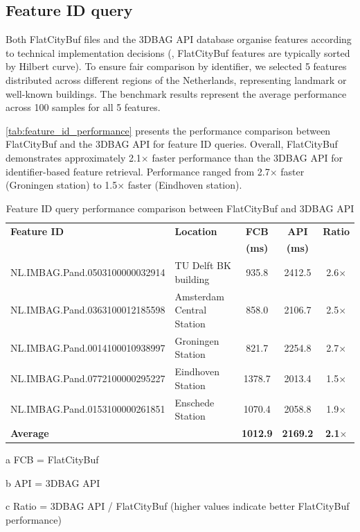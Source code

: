 \subsection{Feature ID query}
\label{result:benchmark_over_the_web:feature_id_query}

Both FlatCityBuf files and the 3DBAG API database organise features according to technical implementation decisions (\eg, FlatCityBuf features are typically sorted by Hilbert curve). To ensure fair comparison by identifier, we selected 5 features distributed across different regions of the Netherlands, representing landmark or well-known buildings. The benchmark results represent the average performance across 100 samples for all 5 features.

\autoref{tab:feature_id_performance} presents the performance comparison between FlatCityBuf and the 3DBAG API for feature ID queries. Overall, FlatCityBuf demonstrates approximately 2.1$\times$ faster performance than the 3DBAG API for identifier-based feature retrieval. Performance ranged from 2.7$\times$ faster (Groningen station) to 1.5$\times$ faster (Eindhoven station).

\begin{table}[ht]
  \centering
  \caption{Feature ID query performance comparison between FlatCityBuf and 3DBAG API}
  \label{tab:feature_id_performance}
  \begin{tabular}{llccc}
    \toprule
    \textbf{Feature ID} & \textbf{Location} & \textbf{FCB\tnote{a}} & \textbf{API\tnote{b}} & \textbf{Ratio\tnote{c}} \\
    & & \textbf{(ms)} & \textbf{(ms)} & \\
    \midrule
    NL.IMBAG.Pand.0503100000032914 & TU Delft BK building & 935.8 & 2412.5 & 2.6$\times$ \\
    NL.IMBAG.Pand.0363100012185598 & Amsterdam Central Station & 858.0 & 2106.7 & 2.5$\times$ \\
    NL.IMBAG.Pand.0014100010938997 & Groningen Station & 821.7 & 2254.8 & 2.7$\times$ \\
    NL.IMBAG.Pand.0772100000295227 & Eindhoven Station & 1378.7 & 2013.4 & 1.5$\times$ \\
    NL.IMBAG.Pand.0153100000261851 & Enschede Station & 1070.4 & 2058.8 & 1.9$\times$ \\
    \midrule
    \textbf{Average} & & \textbf{1012.9} & \textbf{2169.2} & \textbf{2.1$\times$} \\
    \bottomrule
  \end{tabular}

  \begin{tablenotes}[flushleft]
    \footnotesize
  \item[a] FCB = FlatCityBuf
  \item[b] API = 3DBAG API
  \item[c] Ratio = 3DBAG API / FlatCityBuf (higher values indicate better FlatCityBuf performance)
  \end{tablenotes}
\end{table}

